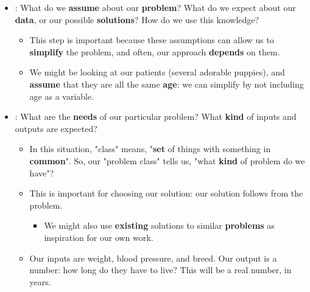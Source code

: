             \begin{itemize}
                \item {}: What do we \textbf{assume} about our \textbf{problem}? What do we expect about our \textbf{data}, or our possible \textbf{solutions}? How do we use this knowledge?
                
                    \begin{itemize}
                        \item This step is important because these assumptions can allow us to \textbf{simplify} the problem, and often, our approach \textbf{depends} on them.
                        
                        \item \miniex We might be looking at our patients (several adorable puppies), and \textbf{assume} that they are all the same \textbf{age}: we can simplify by not including age as a variable.
                    \end{itemize}
                
                \item {}: What are the \textbf{needs} of our particular problem? What \textbf{kind} of inputs and outputs are expected?
                    \begin{itemize}
                        \item In this situation, "class" means, "\textbf{set} of things with something in \textbf{common}". So, our "problem class" tells us, "what \textbf{kind} of problem do we have"? 
                        
                        \item This is important for choosing our solution: our solution follows from the problem.  
                            \begin{itemize}
                                \item We might also use \textbf{existing} solutions to similar \textbf{problems} as inspiration for our own work.
                            \end{itemize}
                            
                        \item \miniex Our inputs are weight, blood pressure, and breed. Our output is a number: how long do they have to live? This will be a real number, in years.
                        

\end{itemize}
\end{itemize}
